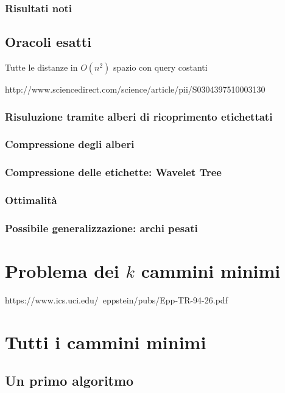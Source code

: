\documentclass[a4paper,10pt]{amsbook}
\theoremstyle{plain}
\theoremstyle{definition}
\theoremstyle{remark}
\begin{document}
\subsection{Risultati noti}

\section{Oracoli esatti}

Tutte le distanze in $O(n^2)$ spazio con query costanti

http://www.sciencedirect.com/science/article/pii/S0304397510003130

\subsection{Risuluzione tramite alberi di ricoprimento etichettati}

\subsection{Compressione degli alberi}

\subsection{Compressione delle etichette: Wavelet Tree}

\subsection{Ottimalità}

\subsection{Possibile generalizzazione: archi pesati}


\chapter{Problema dei $k$ cammini minimi}

https://www.ics.uci.edu/~eppstein/pubs/Epp-TR-94-26.pdf

\chapter{Tutti i cammini minimi}

\section{Un primo algoritmo}
\end{document}
